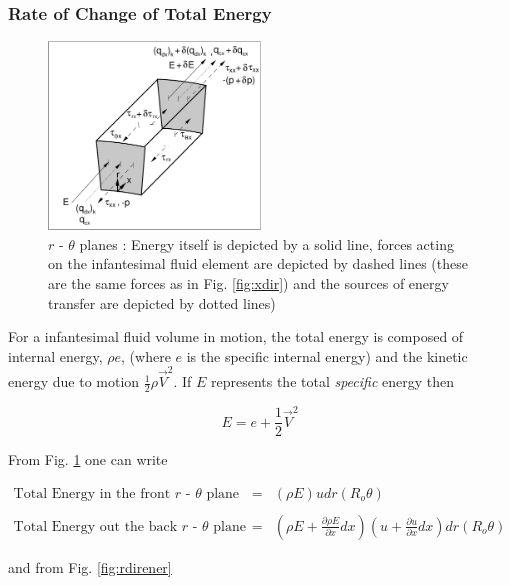 \subsubsection{Rate of Change of Total Energy}

\begin{figure}[ht]
\includegraphics[height=5cm]{./xdirener.eps}
\caption[$r$ - $\theta$ planes]{$r$ - $\theta$ planes : Energy itself is depicted by a solid line, forces  
				acting on the infantesimal fluid element are depicted by dashed lines (these
				are the same forces as in Fig. \ref{fig:xdir}) and the sources of energy
				transfer are depicted by dotted lines)}
\label{fig:xdirener}
\end{figure}

	For a infantesimal fluid volume in motion, the total energy is composed of internal energy, $\rho e$,
(where $e$ is the specific internal energy) and the kinetic energy due to motion $\frac{1}{2}\rho\vec{V}^2$.  
If $E$ represents the total \emph{specific} energy then

\begin{equation}
	E = e + \frac{1}{2}\vec{V}^2 
\label{eqn:spenergy}
\end{equation}

	From Fig. \ref{fig:xdirener} one can write

\begin{displaymath}
	\begin{array}{ccc}
		\textrm{Total Energy in the front $r$ - $\theta$ plane} & = & 
		(\rho E)u dr(R_o \theta) \\ & & \\
		\textrm{Total Energy out the back $r$ - $\theta$ plane} & = &
		(\rho E + \frac{\partial \rho E}{\partial x}dx)(u + \frac{\partial u}{\partial x}dx)dr(R_o \theta)
	\end{array}
\end{displaymath}	

	and from Fig. \ref{fig:rdirener}

